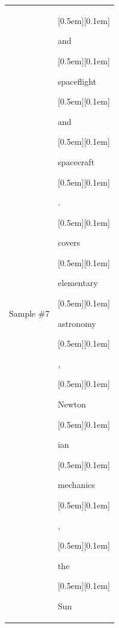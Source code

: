 \begin{table}[ht]
\begin{tabular}{@{}l p{13cm}@{}}
\vspace{10pt}
Sample \#7 &
{\setlength{\fboxsep}{1pt}\raisebox{0pt}[0.5em][0.1em]{\colorbox{Salmon!60}{\strut{ and}}}}{\setlength{\fboxsep}{1pt}\raisebox{0pt}[0.5em][0.1em]{\colorbox{DarkOrchid!25}{\strut{ spaceflight}}}}{\setlength{\fboxsep}{1pt}\raisebox{0pt}[0.5em][0.1em]{\colorbox{DarkOrchid!25}{\strut{ and}}}}{\setlength{\fboxsep}{1pt}\raisebox{0pt}[0.5em][0.1em]{\colorbox{DarkOrchid!25}{\strut{ spacecraft}}}}{\setlength{\fboxsep}{1pt}\raisebox{0pt}[0.5em][0.1em]{\colorbox{DarkOrchid!25}{\strut{.}}}}{\setlength{\fboxsep}{1pt}\raisebox{0pt}[0.5em][0.1em]{\colorbox{SkyBlue!55}{\strut{ covers}}}}{\setlength{\fboxsep}{1pt}\raisebox{0pt}[0.5em][0.1em]{\colorbox{Salmon!60}{\strut{ elementary}}}}{\setlength{\fboxsep}{1pt}\raisebox{0pt}[0.5em][0.1em]{\colorbox{DarkOrchid!25}{\strut{ astronomy}}}}{\setlength{\fboxsep}{1pt}\raisebox{0pt}[0.5em][0.1em]{\colorbox{SkyBlue!55}{\strut{,}}}}{\setlength{\fboxsep}{1pt}\raisebox{0pt}[0.5em][0.1em]{\colorbox{Salmon!60}{\strut{ Newton}}}}{\setlength{\fboxsep}{1pt}\raisebox{0pt}[0.5em][0.1em]{\colorbox{Salmon!60}{\strut{ian}}}}{\setlength{\fboxsep}{1pt}\raisebox{0pt}[0.5em][0.1em]{\colorbox{DarkOrchid!25}{\strut{ mechanics}}}}{\setlength{\fboxsep}{1pt}\raisebox{0pt}[0.5em][0.1em]{\colorbox{SkyBlue!55}{\strut{,}}}}{\setlength{\fboxsep}{1pt}\raisebox{0pt}[0.5em][0.1em]{\colorbox{SkyBlue!55}{\strut{ the}}}}{\setlength{\fboxsep}{1pt}\raisebox{0pt}[0.5em][0.1em]{\colorbox{Salmon!60}{\strut{ Sun}}}}


\end{tabular}
\end{table}
